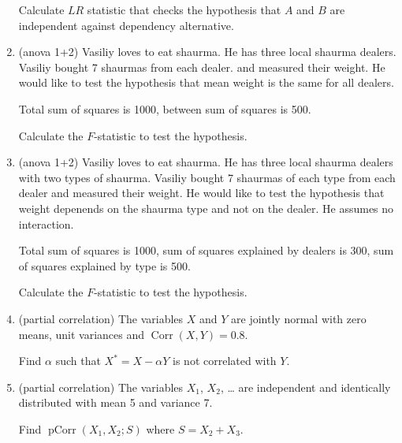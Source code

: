 \documentclass[12pt]{article}
\DeclareMathOperator{\Corr}{Corr}
\DeclareMathOperator{\pCorr}{pCorr}
\begin{document}
\begin{enumerate}
    Calculate $LR$ statistic that checks the hypothesis that $A$ and $B$ are independent against dependency alternative. 

    \item (anova 1+2) Vasiliy loves to eat shaurma. He has three local shaurma dealers. Vasiliy bought 7 shaurmas from each dealer. 
    and measured their weight. He would like to test the hypothesis that mean weight is the same for all dealers. 

    Total sum of squares is 1000, between sum of squares is 500. 

    Calculate the $F$-statistic to test the hypothesis.
    
    \item (anova 1+2) Vasiliy loves to eat shaurma. He has three local shaurma dealers with two types of shaurma.  
    Vasiliy bought 7 shaurmas of each type from each dealer 
    and measured their weight. He would like to test the hypothesis that weight depenends on the shaurma type and not on the dealer.
    He assumes no interaction.  

    Total sum of squares is 1000, sum of squares explained by dealers is 300, sum of squares explained by type is 500. 

    Calculate the $F$-statistic to test the hypothesis.

    \item (partial correlation) The variables $X$ and $Y$ are jointly normal with zero means,
unit variances and $\Corr(X, Y) = 0.8$. 

Find $\alpha$ such that $X^* = X - \alpha Y$ is not correlated with $Y$. 

\item (partial correlation) The variables $X_1$, $X_2$, \ldots{ } are independent and identically distributed with mean 5 and variance 7. 

Find $\pCorr(X_1, X_2; S)$ where $S = X_2 + X_3$.
    
    
\end{enumerate}
\end{document}
